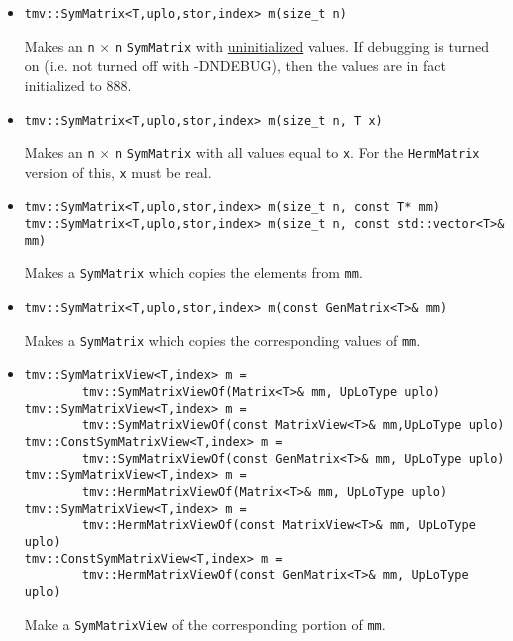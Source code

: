 \documentclass[twoside,letterpaper,11pt]{article}
\renewcommand{\tt}[1]{{\texttt {#1}}}
\begin{document}
\begin{itemize}
\item 
\begin{verbatim}
tmv::SymMatrix<T,uplo,stor,index> m(size_t n)
\end{verbatim}
Makes an \tt{n} $\times$ \tt{n} \tt{SymMatrix} with \underline{uninitialized} values.
If debugging is turned on (i.e. not turned off
with -DNDEBUG), then the values are in fact initialized to 888.  

\item
\begin{verbatim}
tmv::SymMatrix<T,uplo,stor,index> m(size_t n, T x)
\end{verbatim}
Makes an \tt{n} $\times$ \tt{n} \tt{SymMatrix} with all values equal to \tt{x}.
For the \tt{HermMatrix} version of this, \tt{x} must be real.

\item
\begin{verbatim}
tmv::SymMatrix<T,uplo,stor,index> m(size_t n, const T* mm)
tmv::SymMatrix<T,uplo,stor,index> m(size_t n, const std::vector<T>& mm)
\end{verbatim}
Makes a \tt{SymMatrix} which copies the elements from \tt{mm}.  

\item 
\begin{verbatim}
tmv::SymMatrix<T,uplo,stor,index> m(const GenMatrix<T>& mm)
\end{verbatim}
Makes a \tt{SymMatrix} which copies the corresponding values of \tt{mm}.  

\item
\begin{verbatim}
tmv::SymMatrixView<T,index> m = 
        tmv::SymMatrixViewOf(Matrix<T>& mm, UpLoType uplo)
tmv::SymMatrixView<T,index> m = 
        tmv::SymMatrixViewOf(const MatrixView<T>& mm,UpLoType uplo)
tmv::ConstSymMatrixView<T,index> m = 
        tmv::SymMatrixViewOf(const GenMatrix<T>& mm, UpLoType uplo)
tmv::SymMatrixView<T,index> m = 
        tmv::HermMatrixViewOf(Matrix<T>& mm, UpLoType uplo)
tmv::SymMatrixView<T,index> m = 
        tmv::HermMatrixViewOf(const MatrixView<T>& mm, UpLoType uplo)
tmv::ConstSymMatrixView<T,index> m = 
        tmv::HermMatrixViewOf(const GenMatrix<T>& mm, UpLoType uplo)
\end{verbatim}
Make a \tt{SymMatrixView} of the corresponding portion of \tt{mm}.  


\end{itemize}
\end{document}
